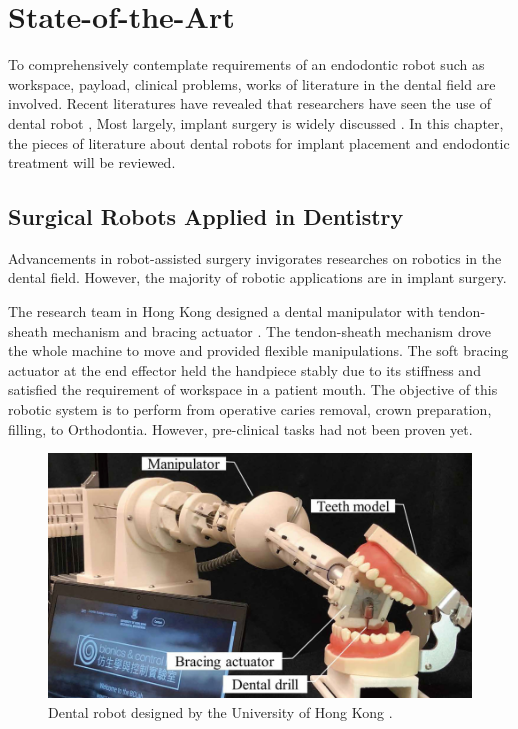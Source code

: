 \chapter{State-of-the-Art}
\label{chapter2}
\hspace*{6mm}To comprehensively contemplate requirements of an endodontic robot such as workspace, payload, clinical problems, works of literature in the dental field are involved. Recent literatures have revealed that researchers have seen the use of dental robot \cite{rawtiya2014application,s21103308,bhat2017robotics}, Most largely, implant surgery is widely discussed \cite{haidar2017autonomous,wu2019robotics}. In this chapter, the pieces of literature about dental robots for implant placement and endodontic treatment will be reviewed.
\section{Surgical Robots Applied in Dentistry}
\hspace*{6mm}Advancements in robot-assisted surgery invigorates researches on robotics in the dental field. However, the majority of robotic applications are in implant surgery. 
\par
The research team in Hong Kong designed a dental manipulator with tendon-sheath mechanism and bracing actuator \cite{Li2019ACD}. The tendon-sheath mechanism drove the whole machine to move and provided flexible manipulations. The soft bracing actuator at the end effector held the handpiece stably due to its stiffness and satisfied the requirement of workspace in a patient mouth. The objective of this robotic system is to perform from operative caries removal, crown preparation, filling, to Orthodontia. However, pre-clinical tasks had not been proven yet.
\begin{figure}[htbp]
\begin{center}
\includegraphics[width=0.7\linewidth]{Images/hongkong_1.png}
\caption[Dental robot designed by the University of Hong Kong]{
Dental robot designed by the University of Hong Kong \cite{Li2019ACD}.
}\label{fig:hongkong}
\end{center}
\end{figure}
